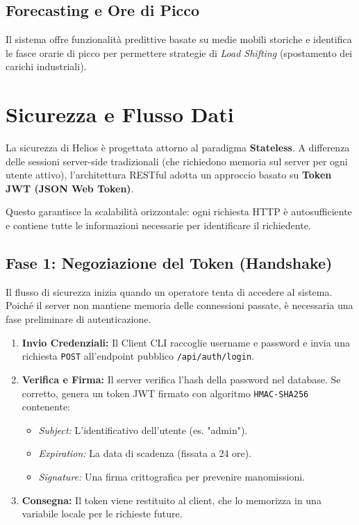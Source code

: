 \documentclass[a4paper,12pt]{report}
\begin{document}
\section{Forecasting e Ore di Picco}
Il sistema offre funzionalità predittive basate su medie mobili storiche e identifica le fasce orarie di picco per permettere strategie di \textit{Load Shifting} (spostamento dei carichi industriali).

\chapter{Sicurezza e Flusso Dati}

La sicurezza di Helios è progettata attorno al paradigma \textbf{Stateless}. A differenza delle sessioni server-side tradizionali (che richiedono memoria sul server per ogni utente attivo), l'architettura RESTful adotta un approccio basato su \textbf{Token JWT (JSON Web Token)}. 

Questo garantisce la scalabilità orizzontale: ogni richiesta HTTP è autosufficiente e contiene tutte le informazioni necessarie per identificare il richiedente.

\section{Fase 1: Negoziazione del Token (Handshake)}
Il flusso di sicurezza inizia quando un operatore tenta di accedere al sistema. Poiché il server non mantiene memoria delle connessioni passate, è necessaria una fase preliminare di autenticazione.

\begin{enumerate}
    \item \textbf{Invio Credenziali:} Il Client CLI raccoglie username e password e invia una richiesta \texttt{POST} all'endpoint pubblico \texttt{/api/auth/login}.
    \item \textbf{Verifica e Firma:} Il server verifica l'hash della password nel database. Se corretto, genera un token JWT firmato con algoritmo \texttt{HMAC-SHA256} contenente:
    \begin{itemize}
        \item \textit{Subject:} L'identificativo dell'utente (es. "admin").
        \item \textit{Expiration:} La data di scadenza (fissata a 24 ore).
        \item \textit{Signature:} Una firma crittografica per prevenire manomissioni.
    \end{itemize}
    \item \textbf{Consegna:} Il token viene restituito al client, che lo memorizza in una variabile locale per le richieste future.
\end{enumerate}
\end{document}
